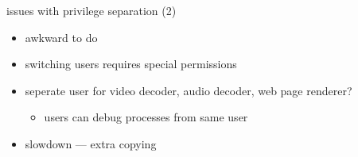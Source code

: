 
\begin{frame}{issues with privilege separation (2)}
    \begin{itemize}
    \item awkward to do
    \item switching users requires special permissions
    \item seperate user for  video decoder, audio decoder, web page renderer?
        \begin{itemize}
        \item users can debug processes from same user
        \end{itemize}
    \item slowdown --- extra copying
    \end{itemize}
\end{frame}

